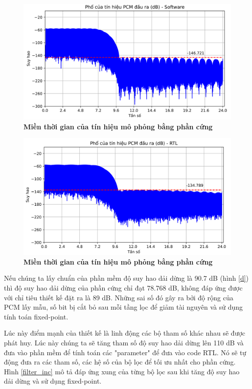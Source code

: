 \begin{figure}[H]
    \centering
    \includegraphics[width=12cm]{Images/Chuong4/tb/sim/sin_1_psd.png}
    \caption[Miền thời gian của tín hiệu mô phỏng bằng phần cứng]{\bfseries \fontsize{12pt}{0pt}\selectfont Miền thời gian của tín hiệu mô phỏng bằng phần cứng}
    \label{sin_1_psd}
\end{figure}

\begin{figure}[H]
    \centering
    \includegraphics[width=12cm]{Images/Chuong4/tb/sim/sin_1_psd_h.png}
    \caption[Miền thời gian của tín hiệu mô phỏng bằng phần cứng]{\bfseries \fontsize{12pt}{0pt}\selectfont Miền thời gian của tín hiệu mô phỏng bằng phần cứng}
    \label{sin_1_psd_h}
\end{figure}
Nếu chúng ta lấy chuẩn của phần mềm độ suy hao dải dừng là 90.7 dB (hình \ref{d}) thì độ suy hao dải dừng của phần cứng chỉ đạt 78.768 dB, không đáp ứng được với chỉ tiêu thiết kế đặt ra là 89 dB. Những sai số đó gây ra bởi độ rộng của PCM lấy mẫu, số bit bị cắt bỏ sau mỗi tầng lọc để giảm tài nguyên và sử dụng tính toán fixed-point.

Lúc này điểm mạnh của thiết kế là linh động các bộ tham số khác nhau sẽ được phát huy. Lúc này chúng ta sẽ tăng tham số độ suy hao dải dừng lên 110 dB và đưa vào phần mềm để tính toán các "parameter" để đưa vào code RTL. Nó sẽ tự động đưa ra các tham số, các hệ số của bộ lọc để tối ưu nhất cho phần cứng. Hình \ref{filter_inc} mô tả đáp ứng xung của từng bộ lọc sau khi tăng độ suy hao dải dừng và sử dụng fixed-point.

